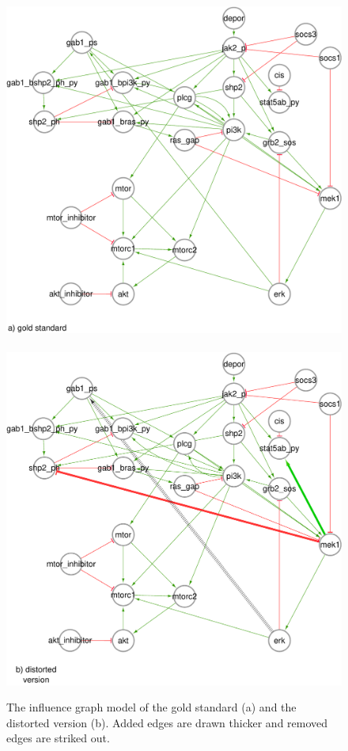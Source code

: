 \begin{figure}[h]
\begin{center}
 \includegraphics[scale=.45,keepaspectratio=true]{./figures/gold_standard_IG.pdf}
 ~~~
 \includegraphics[scale=.45,keepaspectratio=true]{./figures/distorted_IG.pdf}

 \caption{
   The influence graph model of the gold standard (a) and the distorted version (b).
   Added edges are drawn thicker and removed edges are striked out.
 }
 \label{fig:goldVSdistorted}
\end{center}
\end{figure}

